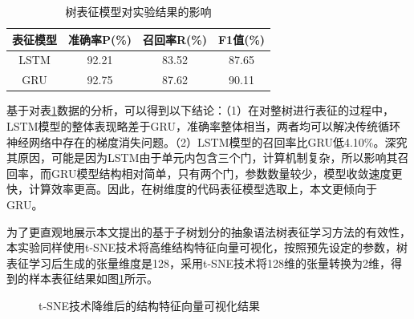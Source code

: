 \begin{table}[htp]  
  \centering  
  \caption{树表征模型对实验结果的影响}   
  \label{tab:tree2}
  \begin{tabular*}{0.9\textwidth}{@{\extracolsep{\fill}}cccc}  
  \toprule  
  表征模型 & 准确率P(\%) & 召回率R(\%) & F1值(\%)  \\  
  \midrule
  LSTM			  & 92.21	  & 83.52	 & 87.65		\\  
  GRU		      & 92.75	  & 87.62	 & 90.11 \\ 
  \bottomrule  
  \end{tabular*}  
\end{table}

基于对表\ref{tab:tree2}数据的分析，可以得到以下结论：（1）在对整树进行表征的过程中，LSTM模型的整体表现略差于GRU，准确率整体相当，两者均可以解决传统循环神经网络中存在的梯度消失问题。（2）LSTM模型的召回率比GRU低4.10\%。深究其原因，可能是因为LSTM由于单元内包含三个门，计算机制复杂，所以影响其召回率，而GRU模型结构相对简单，只有两个门，参数数量较少，模型收敛速度更快，计算效率更高。因此，在树维度的代码表征模型选取上，本文更倾向于GRU。

为了更直观地展示本文提出的基于子树划分的抽象语法树表征学习方法的有效性，本实验同样使用t-SNE技术将高维结构特征向量可视化，按照预先设定的参数，树表征学习后生成的张量维度是128，采用t-SNE技术将128维的张量转换为2维，得到的样本表征结果如图\ref{fig:origintwo}所示。

\begin{figure}[H] 
  \centering  %
  \caption{t-SNE技术降维后的结构特征向量可视化结果}    %
  \label{fig:origintwo}    %
\end{figure}

